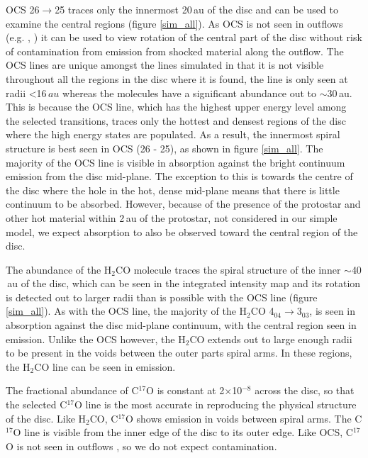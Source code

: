 \documentclass[useAMS,usenatbib]{mn2e}
\begin{document}
OCS 26$\rightarrow$25 traces only the innermost 20$\,$au of the disc and can be used to examine the central regions (figure \ref{sim_all}). As OCS is not seen in outflows (e.g. \citealt{Stanke2007}, \citealt{VDTak2003}) it can be used to view rotation of the central part of the disc without risk of contamination from emission from shocked material along the outflow. The OCS lines are unique amongst the lines simulated in that it is not visible throughout all the regions in the disc where it is found, the line is only seen at radii <16$\,au$ whereas the molecules have a significant abundance out to $\sim$30$\,$au. This is because the OCS line, which has the highest upper energy level among the selected transitions, traces only the hottest and densest regions of the disc where the high energy states are populated. As a result, the innermost spiral structure is best seen in OCS (26 - 25), as shown in figure \ref{sim_all}. The majority of the OCS line is visible in absorption against the bright continuum emission from the disc mid-plane. The exception to this is towards the centre of the disc where the hole in the hot, dense mid-plane means that there is little continuum to be absorbed. However, because of the presence of the protostar and other hot material within 2$\,$au of the protostar, not considered in our simple model, we expect absorption to also be observed toward the central region of the disc.\smallskip

The abundance of the H$_2$CO molecule traces the spiral structure of the inner $\sim$40$\,$au of the disc, which can be seen in the integrated intensity map and its rotation is detected out to larger radii than is possible with the OCS line (figure \ref{sim_all}). As with the OCS line, the majority of the H$_2$CO 4$_{04}\rightarrow$3$_{03}$, is seen in absorption against the disc mid-plane continuum, with the central region seen in emission. Unlike the OCS however, the H$_2$CO extends out to large enough radii to be present in the voids between the outer parts spiral arms. In these regions, the H$_2$CO line can be seen in emission.\smallskip

The fractional abundance of C$^{17}$O is constant at 2$\times$10$^{-8}$ across the disc, so that the selected C$^{17}$O line is the most accurate in reproducing the physical structure of the disc. Like H$_2$CO, C$^{17}$O shows emission in voids between spiral arms. The C$^{17}$O line is visible from the inner edge of the disc to its outer edge. Like OCS, C$^{17}$O is not seen in outflows \citep{Yildiz2012}, so we do not expect contamination.\smallskip
\end{document}
